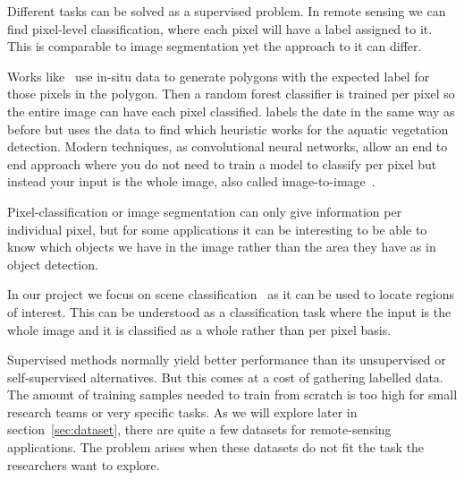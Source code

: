 \documentclass[conference]{IEEEtran}
\begin{document}
    Different tasks can be solved as a supervised problem.
    In remote sensing we can find pixel-level classification, where each pixel will have a label assigned to it.
    This is comparable to image segmentation yet the approach to it can differ.

    Works like~\citet{rs12244021} use in-situ data to generate polygons with the expected label for those pixels in the polygon.
    Then a random forest classifier is trained per pixel so the entire image can have each pixel classified.
    \citet{rs14133013} labels the date in the same way as before but uses the data to find which heuristic works for the aquatic vegetation detection.
    Modern techniques, as convolutional neural networks, allow an end to end approach where you do not need to train
    a model to classify per pixel but instead your input is the whole image, also called image-to-image~\cite{rs12244140}.

    Pixel-classification or image segmentation can only give information per individual pixel, but for some applications it can be interesting to be able
    to know which objects we have in the image rather than the area they have as in object detection.

    In our project we focus on scene classification~\cite{9127795} as it can be used to locate regions of interest.
    This can be understood as a classification task where the input is the whole image and it is classified as a whole rather than per pixel
    basis.

    Supervised methods normally yield better performance than its unsupervised or self-supervised alternatives.
    But this comes at a cost of gathering labelled data.
    The amount of training samples needed to train from scratch is too high for small research teams or very specific tasks.
    As we will explore later in section~\ref{sec:dataset}, there are quite a few datasets for remote-sensing applications.
    The problem arises when these datasets do not fit the task the researchers want to explore.
\end{document}
